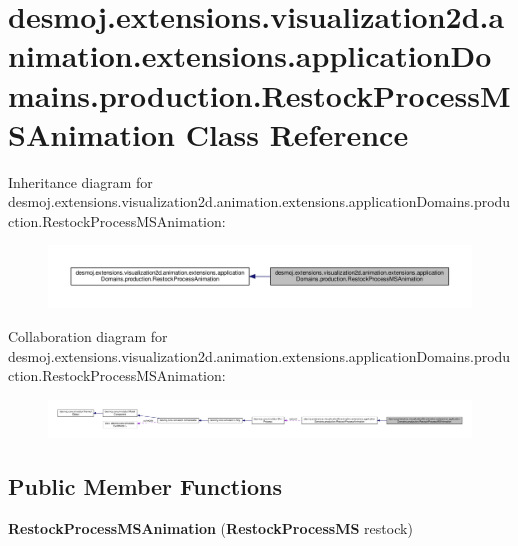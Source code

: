 \section{desmoj.\-extensions.\-visualization2d.\-animation.\-extensions.\-application\-Domains.\-production.\-Restock\-Process\-M\-S\-Animation Class Reference}
\label{classdesmoj_1_1extensions_1_1visualization2d_1_1animation_1_1extensions_1_1application_domains_145778755ef8c03da71e6e4b963d99235}


Inheritance diagram for desmoj.\-extensions.\-visualization2d.\-animation.\-extensions.\-application\-Domains.\-production.\-Restock\-Process\-M\-S\-Animation\-:
\nopagebreak
\begin{figure}[H]
\begin{center}
\leavevmode
\includegraphics[width=350pt]{classdesmoj_1_1extensions_1_1visualization2d_1_1animation_1_1extensions_1_1application_domains_1deae7ba2ff4bccd2465b35e165bf1f09}
\end{center}
\end{figure}


Collaboration diagram for desmoj.\-extensions.\-visualization2d.\-animation.\-extensions.\-application\-Domains.\-production.\-Restock\-Process\-M\-S\-Animation\-:
\nopagebreak
\begin{figure}[H]
\begin{center}
\leavevmode
\includegraphics[width=350pt]{classdesmoj_1_1extensions_1_1visualization2d_1_1animation_1_1extensions_1_1application_domains_1e55ec70e53ca6785b39cd92908402d9b}
\end{center}
\end{figure}
\subsection*{Public Member Functions}
\begin{DoxyCompactItemize}
\item 
{\bfseries Restock\-Process\-M\-S\-Animation} ({\bf Restock\-Process\-M\-S} restock)\label{classdesmoj_1_1extensions_1_1visualization2d_1_1animation_1_1extensions_1_1application_domains_145778755ef8c03da71e6e4b963d99235_adf4f826ed86b7e26d1cea9b43692b1c0}

\end{DoxyCompactItemize}
